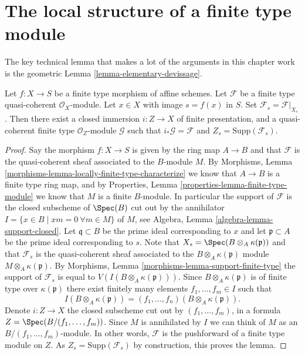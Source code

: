 \section{The local structure of a finite type module}
\label{section-local-structure-module}

\noindent
The key technical lemma that makes a lot of the arguments in this
chapter work is the geometric
Lemma \ref{lemma-elementary-devissage}.

\begin{lemma}
\label{lemma-sheaf-lives-on-subscheme}
Let $f : X \to S$ be a finite type morphism of affine schemes.
Let $\mathcal{F}$ be a finite type quasi-coherent $\mathcal{O}_X$-module.
Let $x \in X$ with image $s = f(x)$ in $S$.
Set $\mathcal{F}_s = \mathcal{F}|_{X_s}$.
Then there exist a closed immersion $i : Z \to X$ of finite presentation,
and a quasi-coherent finite type $\mathcal{O}_Z$-module $\mathcal{G}$
such that $i_*\mathcal{G} = \mathcal{F}$ and
$Z_s = \text{Supp}(\mathcal{F}_s)$.
\end{lemma}

\begin{proof}
Say the morphism $f : X \to S$ is given by the ring map
$A \to B$ and that $\mathcal{F}$ is the quasi-coherent sheaf
associated to the $B$-module $M$. By
Morphisms, Lemma \ref{morphisms-lemma-locally-finite-type-characterize}
we know that $A \to B$ is a finite type ring map, and by
Properties, Lemma \ref{properties-lemma-finite-type-module}
we know that $M$ is a finite $B$-module. In particular the
support of $\mathcal{F}$ is the closed subscheme of $\Spec(B)$
cut out by the annihilator
$I = \{x \in B \mid xm = 0\ \forall m \in M\}$ of $M$, see
Algebra, Lemma \ref{algebra-lemma-support-closed}.
Let $\mathfrak q \subset B$ be the prime ideal corresponding to $x$
and let $\mathfrak p \subset A$ be the prime ideal corresponding to $s$.
Note that $X_s = \Spec(B \otimes_A \kappa(\mathfrak p))$ and
that $\mathcal{F}_s$ is the quasi-coherent sheaf associated to the
$B \otimes_A \kappa(\mathfrak p)$ module $M \otimes_A \kappa(\mathfrak p)$. By
Morphisms, Lemma \ref{morphisms-lemma-support-finite-type}
the support of $\mathcal{F}_s$ is equal to
$V(I(B \otimes_A \kappa(\mathfrak p)))$. Since
$B \otimes_A \kappa(\mathfrak p)$ is of finite type over $\kappa(\mathfrak p)$
there exist finitely many elements $f_1, \ldots, f_m \in I$
such that
$$
I(B \otimes_A \kappa(\mathfrak p)) =
(f_1, \ldots, f_n)(B \otimes_A \kappa(\mathfrak p)).
$$
Denote $i : Z \to X$ the closed subscheme cut out by
$(f_1, \ldots, f_m)$, in a formula $Z = \Spec(B/(f_1, \ldots, f_m))$.
Since $M$ is annihilated by $I$ we can think of $M$ as an
$B/(f_1, \ldots, f_m)$-module. In other words, $\mathcal{F}$ is the
pushforward of a finite type module on $Z$.
As $Z_s = \text{Supp}(\mathcal{F}_s)$ by construction, this
proves the lemma.
\end{proof}

